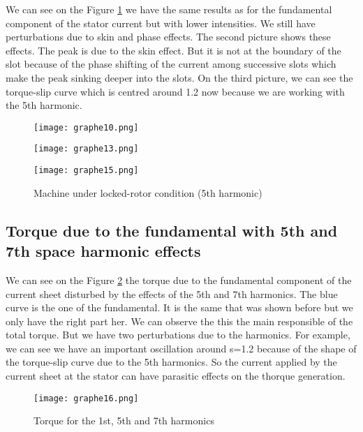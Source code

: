 We can see on the Figure \ref{fig:5th} we have the same results as for the fundamental component of the stator current but with lower intensities. We still have perturbations due to skin and phase effects. The second picture shows these effects. The peak is due to the skin effect. But it is not at the boundary of the slot because of the phase shifting of the current among successive slots which make the peak sinking deeper into the slots. On the third picture, we can see the torque-slip curve which is centred around 1.2 now because we are working with the 5th harmonic. 
\begin{figure}[H]
    \begin{minipage}{.3 \textwidth}
        \texttt{[image: graphe10.png]}
    \end{minipage}
    \begin{minipage}{.3 \textwidth}
        \texttt{[image: graphe13.png]}
        
    \end{minipage}
    \begin{minipage}{.3 \textwidth}
        \texttt{[image: graphe15.png]}
    \end{minipage}
    \caption{Machine under locked-rotor condition (5th harmonic)}
    \label{fig:5th}
\end{figure}

\subsection{Torque due to the fundamental with 5th and 7th space harmonic effects}
We can see on the Figure \ref{fig:total_torque} the torque due to the fundamental component of the current sheet disturbed by the effects of the 5th and 7th harmonics. The blue curve is the one of the fundamental. It is the same that was shown before but we only have the right part her. We can observe the this the main responsible of the total torque. But we have two perturbations due to the harmonics. For example, we can see we have an important oscillation around s=1.2 because of the shape of the torque-slip curve due to the 5th harmonics. So the current applied by the current sheet at the stator can have parasitic effects on the thorque generation.
\begin{figure}[H]
    \centering
    \texttt{[image: graphe16.png]}
    \caption{Torque for the 1st, 5th and 7th harmonics}
    \label{fig:total_torque}
\end{figure}
